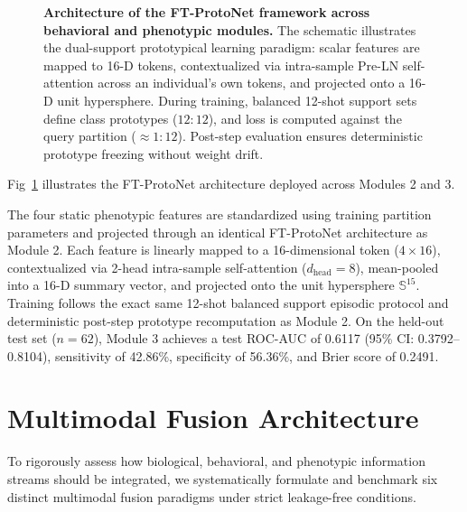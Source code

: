 \documentclass[10pt,letterpaper]{article}
\begin{document}
        \begin{figure}[!h]
        \caption{\textbf{Architecture of the FT-ProtoNet framework across behavioral and phenotypic modules.}
        The schematic illustrates the dual-support prototypical learning paradigm: scalar features are mapped to 16-D tokens, contextualized via intra-sample Pre-LN self-attention across an individual's own tokens, and projected onto a 16-D unit hypersphere. During training, balanced 12-shot support sets define class prototypes ($12:12$), and loss is computed against the query partition ($\approx 1:12$). Post-step evaluation ensures deterministic prototype freezing without weight drift.}
        \label{fig:proto_architecture}
        \end{figure}

        Fig~\ref{fig:proto_architecture} illustrates the FT-ProtoNet architecture deployed across Modules 2 and 3.

        The four static phenotypic features are standardized using training partition parameters and projected through an identical FT-ProtoNet architecture as Module 2. Each feature is linearly mapped to a 16-dimensional token ($4 \times 16$), contextualized via 2-head intra-sample self-attention ($d_{\text{head}} = 8$), mean-pooled into a 16-D summary vector, and projected onto the unit hypersphere $\mathbb{S}^{15}$. Training follows the exact same 12-shot balanced support episodic protocol and deterministic post-step prototype recomputation as Module 2. On the held-out test set ($n=62$), Module 3 achieves a test ROC-AUC of 0.6117 (95\% CI: 0.3792--0.8104), sensitivity of 42.86\%, specificity of 56.36\%, and Brier score of 0.2491.

        \section*{Multimodal Fusion Architecture}

        To rigorously assess how biological, behavioral, and phenotypic information streams should be integrated, we systematically formulate and benchmark six distinct multimodal fusion paradigms under strict leakage-free conditions.
\end{document}
